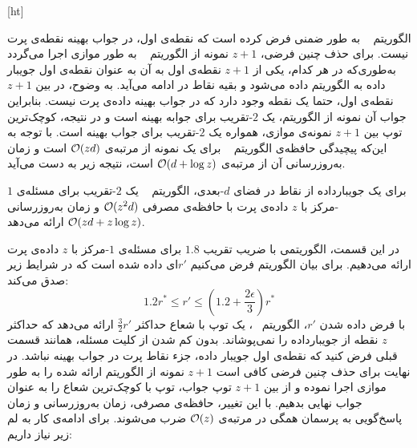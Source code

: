 


[ht]

الگوریتم ~ به طور ضمنی فرض کرده است که نقطه‌ی اول، در جواب بهینه نقطه‌ی پرت نیست. برای حذف چنین فرضی، $z+1$ نمونه از الگوریتم ~ به طور موازی اجرا می‌گردد به‌طوری‌که در هر کدام، یکی از $z+1$ نقطه‌ی اول به آن به عنوان نقطه‌ی اول جویبار داده به الگوریتم داده می‌شود و بقیه نقاط در ادامه می‌آید. به وضوح، در بین $z+1$ نقطه‌ی اول، حتما یک نقطه‌ وجود دارد که در جواب بهینه داده‌ی پرت نیست. بنابراین جواب آن نمونه از الگوریتم، یک $2$-تقریب برای جوابه بهینه است و در نتیجه، کوچک‌ترین توپ بین $z+1$ نمونه‌ی موازی، همواره یک $2$-تقریب برای جواب بهینه است. با توجه به این‌که پیچیدگی حافظه‌ی الگوریتم ~ برای یک نمونه از مرتبه‌ی $\mathcal{O}(zd)$ است و زمان به‌روزرسانی‌ آن از مرتبه‌ی $\mathcal{O}(d + \log{z})$ است، نتیجه زیر به دست می‌آید. 

برای یک جویبار‌داده از نقاط در فضای $d$-بعدی، الگوریتم ~ یک $2$-تقریب برای مسئله‌ی $1$-مرکز با $z$ داده‌ی پرت با حافظه‌ی مصرفی $\mathcal{O}(z^2d)$ و زمان به‌روزرسانی $\mathcal{O}(zd + z\log{z})$ ارائه می‌دهد.



در این قسمت، الگوریتمی با ضریب تقریب $1.8$ برای مسئله‌ی $1$-مرکز با $z$ داده‌ی پرت ارائه می‌دهیم. برای بیان الگوریتم فرض می‌کنیم $r'$ای داده شده است که در شرایط زیر صدق می‌کند:
$$1.2r^* \leq r' \leq (1.2 + \frac{2\epsilon}{3})r^*$$
با فرض داده شدن $r'$، الگوریتم ~، یک توپ با شعاع حداکثر $\frac{3}{2}r'$ ارائه می‌دهد که حداکثر $z$ نقطه از جویبارداده را نمی‌پوشاند. بدون کم شدن از کلیت مسئله، همانند قسمت قبلی فرض کنید که نقطه‌ی اول جویبار داده، جزء نقاط پرت در جواب بهینه نباشد. در نهایت برای حذف چنین فرضی کافی است $z+1$ نمونه از الگوریتم ارائه شده را به طور موازی اجرا نموده و از بین $z+1$ توپ جواب، توپ با کوچک‌ترین شعاع را به عنوان جواب نهایی بدهیم. با این تغییر، حافظه‌ی مصرفی، زمان به‌روزرسانی و زمان پاسخ‌گویی به پرسمان همگی در مرتبه‌ی $\mathcal{O}(z)$ ضرب می‌شوند. برای ادامه‌ی کار به لم زیر نیاز داریم:

